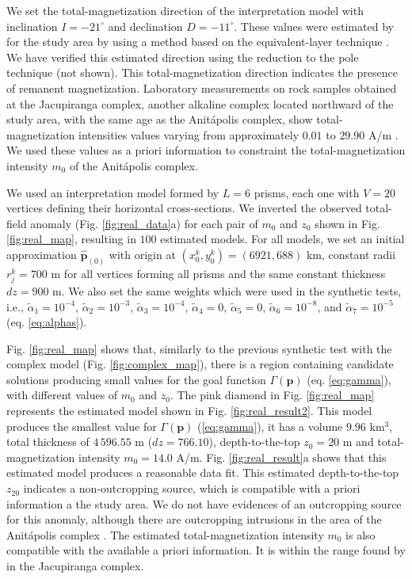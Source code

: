 We set the total-magnetization direction of the interpretation model with
inclination $ I=-21^\circ $ and declination $ D=-11^\circ $. These values were estimated 
by \cite{reis-seg-2019} for the study area by using a method based on the 
equivalent-layer technique \cite[]{dampney1969,emilia1973}. We have verified this estimated 
direction using the reduction to the pole technique (not shown). 
This total-magnetization direction indicates the presence of remanent magnetization.
Laboratory measurements on rock samples obtained at the Jacupiranga complex,
another alkaline complex located northward of the study area, 
with the same age as the Anit{\'a}polis complex, 
show total-magnetization intensities values varying from approximately 
$0.01$ to $29.90$ A/m \citep[][ tb. 1]{valdivia-2009}.
We used these values as a priori information to constraint the 
total-magnetization intensity $m_{0}$ of the Anit{\'a}polis complex.

We used an interpretation model formed by $L = 6$ prisms, each one with 
$V = 20$ vertices defining their horizontal cross-sections.
We inverted the observed total-field anomaly (Fig. \ref{fig:real_data}a) for each 
pair of $m_0$ and $z_0$ shown in Fig. \ref{fig:real_map}, resulting in $100$ estimated 
models. 
For all models, we set an initial approximation $\hat{\mathbf{p}}_{(0)}$ with origin 
at $(x_0^k, y_0^k) = (6921, 688)$ km, constant radii $r_j^k = 700$ m for 
all vertices forming all prisms and the same constant thickness $dz = 900$ m.
We also set the same weights which were used in the synthetic tests, i.e., $\tilde{\alpha}_1 = 10^{-4}$, 
$\tilde{\alpha}_2 = 10^{-3}$, 
$\tilde{\alpha}_3 = 10^{-4}$, $\tilde{\alpha}_4 = 0$, $\tilde{\alpha}_5 = 0$, 
$\tilde{\alpha}_6 = 10^{-8}$, and $\tilde{\alpha}_7 = 10^{-5}$ (eq. \ref{eq:alphas}). 

Fig. \ref{fig:real_map} shows that, similarly to the previous synthetic test with the 
complex model (Fig. \ref{fig:complex_map}), there is a region containing 
candidate solutions producing small values for the goal function 
$\Gamma(\mathbf{p})$ (eq. \ref{eq:gamma}), with different values of $m_0$ and $z_0$.
The pink diamond in Fig. \ref{fig:real_map} represents the estimated model 
shown in Fig. \ref{fig:real_result2}. 
This model produces the smallest value for $ \Gamma(\mathbf{p}) $ (\ref{eq:gamma}),
it has a volume $ 9.96 $ km$ ^3 $, total thickness of $ 4\,596.55 $ m 
($ dz = 766.10 $), depth-to-the-top $z_0 = 20$ m and total-magnetization intensity 
$m_0 = 14.0$ A/m.
Fig. \ref{fig:real_result}a shows that this estimated model produces a reasonable data fit.
This estimated depth-to-the-top $z_20$ indicates a non-outcropping source, 
which is compatible with a priori information a the study area. 
We do not have evidences of an outcropping source for this anomaly, 
although there are outcropping intrusions in the area of the Anit{\'a}polis 
complex \cite[]{gibson-1999}.
The estimated total-magnetization intensity $ m_0 $ is also compatible with the 
available a priori information. It is within the range found by 
\citet{valdivia-2009} in the Jacupiranga complex.

